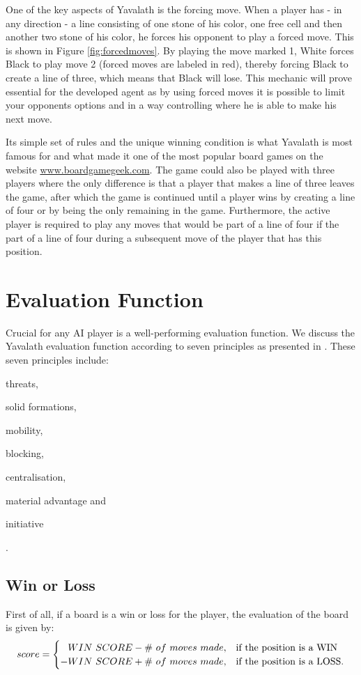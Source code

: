 \documentclass[11pt]{article}
\begin{document}


One of the key aspects of Yavalath is the forcing move. When a player has - in any direction - a line consisting of one stone of his color, one free cell and then another two stone of his color, he forces his opponent to play a forced move. This is shown in Figure \ref{fig:forcedmoves}. By playing the move marked 1, White forces Black to play move 2 (forced moves are labeled in red), thereby forcing Black to create a line of three, which means that Black will lose. This mechanic will prove essential for the developed agent as by using forced moves it is possible to limit your opponents options and in a way controlling where he is able to make his next move.



Its simple set of rules and the unique winning condition is what Yavalath is most famous for and what made it one of the most popular board games on the website \url{www.boardgamegeek.com}. The game could also be played with three players where the only difference is that a player that makes a line of three leaves the game, after which the game is continued until a player wins by creating a line of four or by being the only remaining in the game. Furthermore, the active player is required to play any moves that would be part of a line of four if the part of a line of four during a subsequent move of the player that has this position.

\section{Evaluation Function}
\label{-sec:evaluationfunction}

Crucial for any AI player is a well-performing evaluation function. We discuss the Yavalath evaluation function according to seven principles as presented in \cite{Winands2004}. These seven principles include: \begin{enumerate*}\item threats, \item solid formations, \item mobility, \item blocking, \item centralisation, \item material advantage and \item initiative\end{enumerate*}.

\subsection{Win or Loss}
\label{-subsec:winorloss}
First of all, if a board is a win or loss for the player, the evaluation of the board is given by:
\begin{equation}\label{eq:winscore}
score = \twopartdef{\phantom{-}WIN\ SCORE - \#\ of\ moves\ made}{\mbox{the position is a WIN}}{-WIN\ SCORE + \#\ of\ moves\ made}{\mbox{the position is a LOSS.}}
\end{equation}
\end{document}
